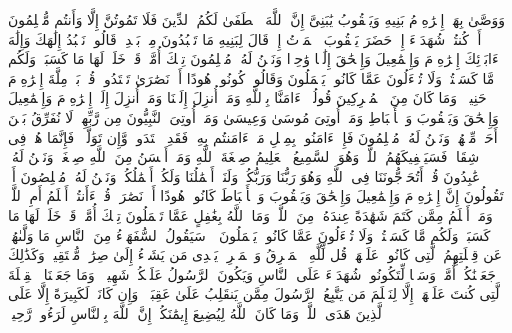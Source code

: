 \stopbuffer%
\startbuffer[\q:2:132]
وَوَصَّىٰ بِهَاۤ إِبۡرَٰهِۦمُ بَنِیهِ وَیَعۡقُوبُ یَٰبَنِیَّ إِنَّ ٱللَّهَ ٱصۡطَفَىٰ لَكُمُ ٱلدِّینَ فَلَا تَمُوتُنَّ إِلَّا وَأَنتُم مُّسۡلِمُونَ%
\stopbuffer%
\startbuffer[\q:2:133]
أَمۡ كُنتُمۡ شُهَدَاۤءَ إِذۡ حَضَرَ یَعۡقُوبَ ٱلۡمَوۡتُ إِذۡ قَالَ لِبَنِیهِ مَا تَعۡبُدُونَ مِنۢ بَعۡدِیۖ قَالُوا۟ نَعۡبُدُ إِلَٰهَكَ وَإِلَٰهَ ءَابَاۤئِكَ إِبۡرَٰهِۦمَ وَإِسۡمَٰعِیلَ وَإِسۡحَٰقَ إِلَٰهࣰا وَٰحِدࣰا وَنَحۡنُ لَهُۥ مُسۡلِمُونَ%
\stopbuffer%
\startbuffer[\q:2:134]
تِلۡكَ أُمَّةࣱ قَدۡ خَلَتۡۖ لَهَا مَا كَسَبَتۡ وَلَكُم مَّا كَسَبۡتُمۡۖ وَلَا تُسۡءَلُونَ عَمَّا كَانُوا۟ یَعۡمَلُونَ%
\stopbuffer%
\startbuffer[\q:2:135]
وَقَالُوا۟ كُونُوا۟ هُودًا أَوۡ نَصَٰرَىٰ تَهۡتَدُوا۟ۗ قُلۡ بَلۡ مِلَّةَ إِبۡرَٰهِۦمَ حَنِیفࣰاۖ وَمَا كَانَ مِنَ ٱلۡمُشۡرِكِینَ%
\stopbuffer%
\startbuffer[\q:2:136]
قُولُوۤا۟ ءَامَنَّا بِٱللَّهِ وَمَاۤ أُنزِلَ إِلَیۡنَا وَمَاۤ أُنزِلَ إِلَىٰۤ إِبۡرَٰهِۦمَ وَإِسۡمَٰعِیلَ وَإِسۡحَٰقَ وَیَعۡقُوبَ وَٱلۡأَسۡبَاطِ وَمَاۤ أُوتِیَ مُوسَىٰ وَعِیسَىٰ وَمَاۤ أُوتِیَ ٱلنَّبِیُّونَ مِن رَّبِّهِمۡ لَا نُفَرِّقُ بَیۡنَ أَحَدࣲ مِّنۡهُمۡ وَنَحۡنُ لَهُۥ مُسۡلِمُونَ%
\stopbuffer%
\startbuffer[\q:2:137]
فَإِنۡ ءَامَنُوا۟ بِمِثۡلِ مَاۤ ءَامَنتُم بِهِۦ فَقَدِ ٱهۡتَدَوا۟ۖ وَّإِن تَوَلَّوۡا۟ فَإِنَّمَا هُمۡ فِی شِقَاقࣲۖ فَسَیَكۡفِیكَهُمُ ٱللَّهُۚ وَهُوَ ٱلسَّمِیعُ ٱلۡعَلِیمُ%
\stopbuffer%
\startbuffer[\q:2:138]
صِبۡغَةَ ٱللَّهِ وَمَنۡ أَحۡسَنُ مِنَ ٱللَّهِ صِبۡغَةࣰۖ وَنَحۡنُ لَهُۥ عَٰبِدُونَ%
\stopbuffer%
\startbuffer[\q:2:139]
قُلۡ أَتُحَاۤجُّونَنَا فِی ٱللَّهِ وَهُوَ رَبُّنَا وَرَبُّكُمۡ وَلَنَاۤ أَعۡمَٰلُنَا وَلَكُمۡ أَعۡمَٰلُكُمۡ وَنَحۡنُ لَهُۥ مُخۡلِصُونَ%
\stopbuffer%
\startbuffer[\q:2:140]
أَمۡ تَقُولُونَ إِنَّ إِبۡرَٰهِۦمَ وَإِسۡمَٰعِیلَ وَإِسۡحَٰقَ وَیَعۡقُوبَ وَٱلۡأَسۡبَاطَ كَانُوا۟ هُودًا أَوۡ نَصَٰرَىٰۗ قُلۡ ءَأَنتُمۡ أَعۡلَمُ أَمِ ٱللَّهُۗ وَمَنۡ أَظۡلَمُ مِمَّن كَتَمَ شَهَٰدَةً عِندَهُۥ مِنَ ٱللَّهِۗ وَمَا ٱللَّهُ بِغَٰفِلٍ عَمَّا تَعۡمَلُونَ%
\stopbuffer%
\startbuffer[\q:2:141]
تِلۡكَ أُمَّةࣱ قَدۡ خَلَتۡۖ لَهَا مَا كَسَبَتۡ وَلَكُم مَّا كَسَبۡتُمۡۖ وَلَا تُسۡءَلُونَ عَمَّا كَانُوا۟ یَعۡمَلُونَ%
\stopbuffer%
\startbuffer[\q:2:142]
۞ سَیَقُولُ ٱلسُّفَهَاۤءُ مِنَ ٱلنَّاسِ مَا وَلَّىٰهُمۡ عَن قِبۡلَتِهِمُ ٱلَّتِی كَانُوا۟ عَلَیۡهَاۚ قُل لِّلَّهِ ٱلۡمَشۡرِقُ وَٱلۡمَغۡرِبُۚ یَهۡدِی مَن یَشَاۤءُ إِلَىٰ صِرَٰطࣲ مُّسۡتَقِیمࣲ%
\stopbuffer%
\startbuffer[\q:2:143]
وَكَذَٰلِكَ جَعَلۡنَٰكُمۡ أُمَّةࣰ وَسَطࣰا لِّتَكُونُوا۟ شُهَدَاۤءَ عَلَى ٱلنَّاسِ وَیَكُونَ ٱلرَّسُولُ عَلَیۡكُمۡ شَهِیدࣰاۗ وَمَا جَعَلۡنَا ٱلۡقِبۡلَةَ ٱلَّتِی كُنتَ عَلَیۡهَاۤ إِلَّا لِنَعۡلَمَ مَن یَتَّبِعُ ٱلرَّسُولَ مِمَّن یَنقَلِبُ عَلَىٰ عَقِبَیۡهِۚ وَإِن كَانَتۡ لَكَبِیرَةً إِلَّا عَلَى ٱلَّذِینَ هَدَى ٱللَّهُۗ وَمَا كَانَ ٱللَّهُ لِیُضِیعَ إِیمَٰنَكُمۡۚ إِنَّ ٱللَّهَ بِٱلنَّاسِ لَرَءُوفࣱ رَّحِیمࣱ%
\stopbuffer%
